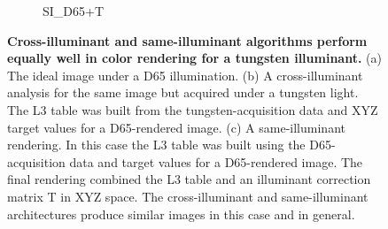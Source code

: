 \documentclass[]{spie}
\begin{document}
\begin{figure}
\begin{center}
\begin{subfigure}[b]{0.3\textwidth}
    \caption{SI\_D65+T}
\end{subfigure}
\end{center}
\caption{\textbf{Cross-illuminant and same-illuminant algorithms perform equally well in color rendering for a tungsten illuminant.} (a) The ideal image under a D65 illumination. (b) A cross-illuminant analysis for the same image but acquired under a tungsten light. The L3 table was built from the tungsten-acquisition data and XYZ target values for a D65-rendered image. (c) A same-illuminant rendering.  In this case the  L3  table was built using the D65-acquisition data and target values for a D65-rendered image.  The final rendering combined the L3  table  and an illuminant correction matrix T in XYZ space. The cross-illuminant and same-illuminant architectures produce similar images in this case and in general.}
\label{fig:filters}
\end{figure}
\end{document}
